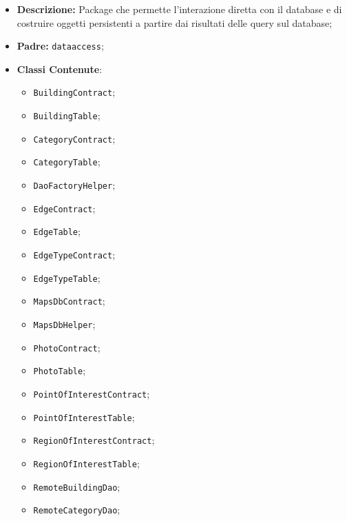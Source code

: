 \documentclass[../DefinizioneDiProdotto.tex]{subfiles}
\begin{document}
    \begin{itemize}
\item \textbf{Descrizione:} Package che permette l'interazione diretta con il database e di costruire oggetti persistenti a partire dai risultati delle query sul database;
\item \textbf{Padre:} \texttt{dataaccess};
\item \textbf{Classi Contenute}:
\begin{itemize}
\item \texttt{BuildingContract};

\item \texttt{BuildingTable};

\item \texttt{CategoryContract};

\item \texttt{CategoryTable};

\item \texttt{DaoFactoryHelper};

\item \texttt{EdgeContract};

\item \texttt{EdgeTable};

\item \texttt{EdgeTypeContract};

\item \texttt{EdgeTypeTable};

\item \texttt{MapsDbContract};

\item \texttt{MapsDbHelper};

\item \texttt{PhotoContract};

\item \texttt{PhotoTable};

\item \texttt{PointOfInterestContract};

\item \texttt{PointOfInterestTable};

\item \texttt{RegionOfInterestContract};

\item \texttt{RegionOfInterestTable};

\item \texttt{RemoteBuildingDao};

\item \texttt{RemoteCategoryDao};


\end{itemize}
\end{itemize}
\end{document}
